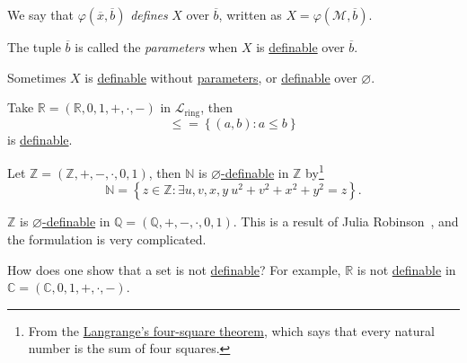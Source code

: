\begin{notation}[Define]\label{not:define}
	We say that \(\varphi (\overline{x} , \overline{b} )\) \emph{defines} \(X\) over \(\overline{b} \), written as \(X = \varphi (\mathcal{M} , \overline{b} )\).
\end{notation}

\begin{notation}[Parameter]\label{not:parameter}
	The tuple \(\overline{b} \) is called the \emph{parameters} when \(X\) is \hyperref[def:definable]{definable} over \(\overline{b} \).
\end{notation}

\begin{remark}
	Sometimes \(X\) is \hyperref[def:definable]{definable} without \hyperref[not:parameter]{parameters}, or \hyperref[def:definable]{definable} over \(\varnothing \).
\end{remark}

\begin{eg}
	Take \(\mathbb{R} =(\mathbb{R} , 0, 1, +, \cdot, -)\) in \(\mathcal{L} _{\text{ring} }\), then
	\[
		\leq = \left\{ (a, b) \colon a \leq b\right\}
	\]
	is \hyperref[def:definable]{definable}.
\end{eg}

\begin{eg}
	Let \(\mathbb{Z} =(\mathbb{Z} , +, -, \cdot, 0, 1)\), then \(\mathbb{N} \) is \hyperref[def:definable]{\(\varnothing \)-definable} in \(\mathbb{Z} \) by\footnote{From the \href{https://en.wikipedia.org/wiki/Lagrange's_four-square_theorem}{Langrange's four-square theorem}, which says that every natural number is the sum of four squares.}
	\[
		\mathbb{N} = \left\{ z\in \mathbb{Z} \colon \exists u, v, x, y\ u^2 + v^2 + x^2 + y^2 = z \right\}.
	\]
\end{eg}

\begin{eg}
	\(\mathbb{Z} \) is \hyperref[def:definable]{\(\varnothing \)-definable} in \(\mathbb{Q} = (\mathbb{Q} , +, -, \cdot, 0, 1)\). This is a result of Julia Robinson~\cite{robinson_1949}, and the formulation is very complicated.
\end{eg}

\begin{problem*}
	How does one show that a set is not \hyperref[def:definable]{definable}? For example, \(\mathbb{R} \) is not \hyperref[def:definable]{definable} in \(\mathbb{C} = (\mathbb{C} , 0, 1, +, \cdot, -)\).
\end{problem*}